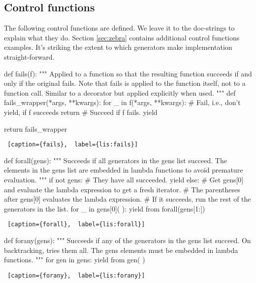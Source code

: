 \subsection{Control functions} \label{subsec:controlfunctions}

The following control functions are defined. We leave it to the doc-strings to explain what they do.  Section \ref{sec:zebra} contains additional control functions examples. It's striking the extent to which generators make implementation straight-forward.

\begin{minipage}{\linewidth}  \largev \hrulefill
\begin{python}[numbers=left]
def fails(f):
  """
  Applied to a function so that the resulting function succeeds if and only if the original fails.
  Note that fails is applied to the function itself, not to a function call.
  Similar to a decorator but applied explicitly when used.
  """
  def fails_wrapper(*args, **kwargs):
    for _ in f(*args, **kwargs):
      # Fail, i.e., don't yield, if f succeeds
      return  
    # Succeed if f fails.
    yield     

  return fails_wrapper
\end{python}
\begin{lstlisting} [caption={fails},  label={lis:fails}]
\end{lstlisting}
\end{minipage}

\begin{minipage}{\linewidth}  \largev \hrulefill
\begin{python}[numbers=left]
def forall(gens):
  """
  Succeeds if all generators in the gens list succeed. The elements in the gens list
  are embedded in lambda functions to avoid premature evaluation.
  """
  if not gens:
    # They have all succeeded.
    yield
  else:
    # Get gens[0] and evaluate the lambda expression to get a fresh iterator.
    # The parentheses after gens[0] evaluates the lambda expression.
    # If it succeeds, run the rest of the generators in the list.
    for _ in gens[0]( ):
      yield from forall(gens[1:])
\end{python}
\begin{lstlisting} [caption={forall},  label={lis:forall}]
\end{lstlisting}
\end{minipage}

\begin{minipage}{\linewidth}  \largev \hrulefill
\begin{python}[numbers=left]
def forany(gens):
  """
  Succeeds if any of the generators in the gens list succeed. On backtracking, tries them all. 
  The gens elements must be embedded in lambda functions.
  """
  for gen in gens:
    yield from gen( )

\end{python}
\begin{lstlisting} [caption={forany},  label={lis:forany}]
\end{lstlisting}
\end{minipage}

